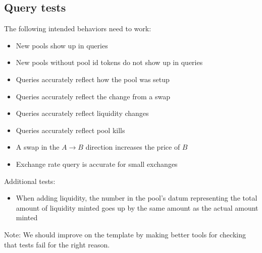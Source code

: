 \documentclass{article}
\begin{document}
\subsection*{Query tests}

The following intended behaviors need to work:
\begin{itemize}
	\item New pools show up in queries
	\item New pools without pool id tokens do not show up in queries
	\item Queries accurately reflect how the pool was setup
	\item Queries accurately reflect the change from a swap
	\item Queries accurately reflect liquidity changes
	\item Queries accurately reflect pool kills
	\item A swap in the $A \rightarrow B$ direction increases the price of $B$
	\item Exchange rate query is accurate for small exchanges
\end{itemize}

Additional tests:
\begin{itemize}
	\item When adding liquidity, the number in the pool's datum representing the
    total amount of liquidity minted goes up by the same amount as the actual amount minted
\end{itemize}

Note: We should improve on the template by making better tools for checking that tests fail for the right reason.
\end{document}
